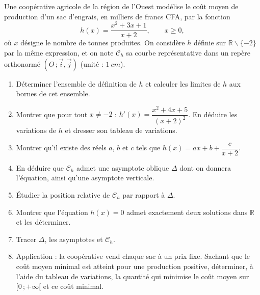 \documentclass[11pt]{article}
\newcounter{popsec}
\newcounter{popsub}
\newcommand{\courssub}[1]{%
  \stepcounter{popsub}%
  \par\vspace{9pt}\noindent{\popxbold\fontsize{11.5}{13}\selectfont\color{popink}{\color{poporange}\thepopsec.\thepopsub}\hspace{6pt}#1}\par\nopagebreak\vspace{4pt}
}
\def\setminus{\mathbin{\backslash}}\let\smallsetminus\setminus
\begin{document}
\courssub{Je me prépare au Bac}

\begin{exercice}
Une coopérative agricole de la région de l'Ouest modélise le coût moyen de production d'un sac d'engrais, en milliers de francs CFA, par la fonction
\[ h(x)=\frac{x^2+3x+1}{x+2},\qquad x\geq 0, \]
où $x$ désigne le nombre de tonnes produites. On considère $h$ définie sur $\mathbb{R}\setminus\{-2\}$ par la même expression, et on note $\mathcal{C}_h$ sa courbe représentative dans un repère orthonormé $(O\,;\vec{i},\vec{j})$ (unité : $\SI{1}{cm}$).
\begin{enumerate}
\item Déterminer l'ensemble de définition de $h$ et calculer les limites de $h$ aux bornes de cet ensemble.
\item Montrer que pour tout $x\neq -2$ : $h'(x)=\dfrac{x^2+4x+5}{(x+2)^2}$. En déduire les variations de $h$ et dresser son tableau de variations.
\item Montrer qu'il existe des réels $a$, $b$ et $c$ tels que $h(x)=ax+b+\dfrac{c}{x+2}$.
\item En déduire que $\mathcal{C}_h$ admet une asymptote oblique $\Delta$ dont on donnera l'équation, ainsi qu'une asymptote verticale.
\item Étudier la position relative de $\mathcal{C}_h$ par rapport à $\Delta$.
\item Montrer que l'équation $h(x)=0$ admet exactement deux solutions dans $\mathbb{R}$ et les déterminer.
\item Tracer $\Delta$, les asymptotes et $\mathcal{C}_h$.
\item Application : la coopérative vend chaque sac à un prix fixe. Sachant que le coût moyen minimal est atteint pour une production positive, déterminer, à l'aide du tableau de variations, la quantité qui minimise le coût moyen sur $[0\,;+\infty[$ et ce coût minimal.
\end{enumerate}
\end{exercice}
\end{document}
